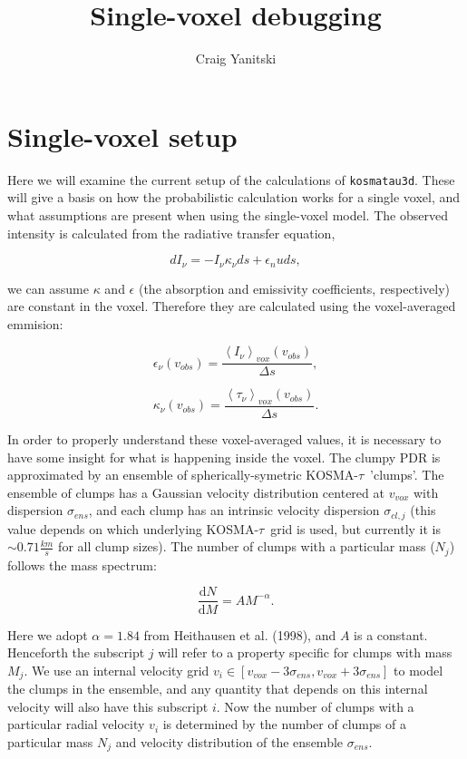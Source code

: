 \documentclass[a4paper]{article}
\newcommand{\kosmatau}{KOSMA-\(\tau\)}
\begin{document}
    \title{Single-voxel debugging}
    \author{Craig Yanitski}
    \maketitle

    \section{Single-voxel setup}
    \label{setup}

    Here we will examine the current setup of the calculations of \texttt{kosmatau3d}.
    These will give a basis on how the probabilistic calculation works for a single voxel, and what assumptions are present when using the single-voxel model.
    The observed intensity is calculated from the radiative transfer equation,

    \[
    dI_\nu = - I_\nu \kappa_\nu ds + \epsilon_nu ds,
    \]

    we can assume \(\kappa\) and \(\epsilon\) (the absorption and emissivity coefficients, respectively) are constant in the voxel.
    Therefore they are calculated using the voxel-averaged emmision:

    \[
    \epsilon_\nu (v_{obs}) = \frac{\left<I_\nu\right>_{vox} (v_{obs})}{\Delta s},
    \]

    \[
    \kappa_\nu (v_{obs}) = \frac{\left<\tau_\nu\right>_{vox} (v_{obs})}{\Delta s}.
    \]

    In order to properly understand these voxel-averaged values, it is necessary to have some insight for what is happening inside the voxel.
    The clumpy PDR is approximated by an ensemble of spherically-symetric \kosmatau \ 'clumps'.
    The ensemble of clumps has a Gaussian velocity distribution centered at \(v_{vox}\) with dispersion \(\sigma_{ens}\), and each clump has an intrinsic velocity dispersion \(\sigma_{cl, j}\) (this value depends on which underlying \kosmatau \ grid is used, but currently it is \(\sim0.71 \frac{km}{s}\) for all clump sizes).
    The number of clumps with a particular mass (\(N_j\)) follows the mass spectrum:

    \[
    \frac{\mathrm{d}N}{\mathrm{d}M} = A M^{-\alpha}.
    \]

    Here we adopt \(\alpha=1.84\) from Heithausen et al. (1998), and \(A\) is a constant.
    Henceforth the subscript \(j\) will refer to a property specific for clumps with mass \(M_j\).
    We use an internal velocity grid \(v_i \in [v_{vox} - 3 \sigma_{ens}, v_{vox} + 3 \sigma_{ens}]\) to model the clumps in the ensemble, and any quantity that depends on this internal velocity will also have this subscript \(i\).
    Now the number of clumps with a particular radial velocity \(v_i\) is determined by the number of clumps of a particular mass \(N_j\) and velocity distribution of the ensemble \(\sigma_{ens}\).
\end{document}
